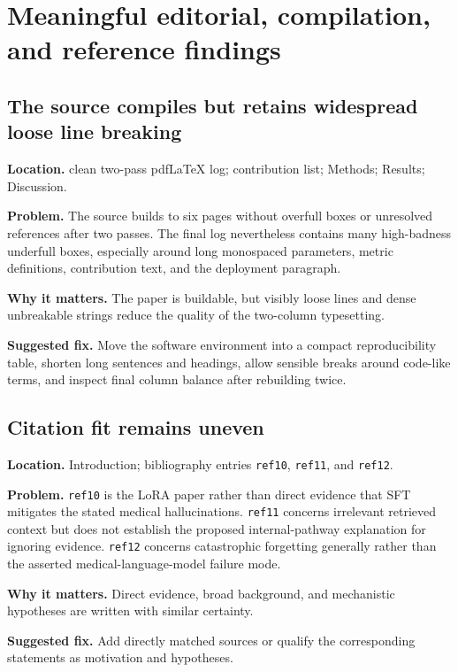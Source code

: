 \documentclass[11pt]{article}
\newcommand{\findinglabel}[1]{\textbf{#1}}
\begin{document}
\section*{Meaningful editorial, compilation, and reference findings}

\subsection*{The source compiles but retains widespread loose line breaking}

\findinglabel{Location.} clean two-pass pdfLaTeX log; contribution list; Methods; Results; Discussion.

\findinglabel{Problem.} The source builds to six pages without overfull boxes or unresolved references after two passes.  The final log nevertheless contains many high-badness underfull boxes, especially around long monospaced parameters, metric definitions, contribution text, and the deployment paragraph.

\findinglabel{Why it matters.} The paper is buildable, but visibly loose lines and dense unbreakable strings reduce the quality of the two-column typesetting.

\findinglabel{Suggested fix.} Move the software environment into a compact reproducibility table, shorten long sentences and headings, allow sensible breaks around code-like terms, and inspect final column balance after rebuilding twice.

\subsection*{Citation fit remains uneven}

\findinglabel{Location.} Introduction; bibliography entries \texttt{ref10}, \texttt{ref11}, and \texttt{ref12}.

\findinglabel{Problem.} \texttt{ref10} is the LoRA paper rather than direct evidence that SFT mitigates the stated medical hallucinations.  \texttt{ref11} concerns irrelevant retrieved context but does not establish the proposed internal-pathway explanation for ignoring evidence.  \texttt{ref12} concerns catastrophic forgetting generally rather than the asserted medical-language-model failure mode.

\findinglabel{Why it matters.} Direct evidence, broad background, and mechanistic hypotheses are written with similar certainty.

\findinglabel{Suggested fix.} Add directly matched sources or qualify the corresponding statements as motivation and hypotheses.
\end{document}

